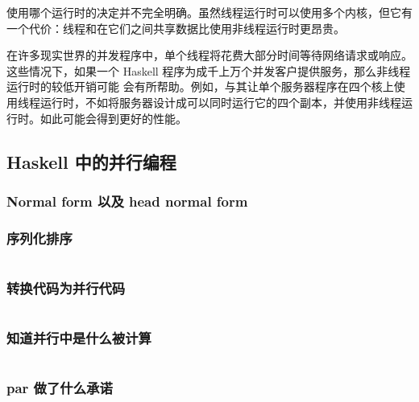 \documentclass[./main.tex]{subfiles}
\begin{document}
使用哪个运行时的决定并不完全明确。虽然线程运行时可以使用多个内核，但它有一个代价：线程和在它们之间共享数据比使用非线程运行时更昂贵。

在许多现实世界的并发程序中，单个线程将花费大部分时间等待网络请求或响应。这些情况下，如果一个 Haskell 程序为成千上万个并发客户提供服务，那么非线程运行时的较低开销可能
会有所帮助。例如，与其让单个服务器程序在四个核上使用线程运行时，不如将服务器设计成可以同时运行它的四个副本，并使用非线程运行时。如此可能会得到更好的性能。

\subsection*{Haskell 中的并行编程}

%

\subsubsection*{Normal form 以及 head normal form}

%

\subsubsection*{序列化排序}

%

\begin{lstlisting}[language=Haskell]

\end{lstlisting}

\subsubsection*{转换代码为并行代码}

%

\begin{lstlisting}[language=Haskell]

\end{lstlisting}

\subsubsection*{知道并行中是什么被计算}

%

\begin{lstlisting}[language=Haskell]

\end{lstlisting}

\subsubsection*{par 做了什么承诺}
\end{document}

